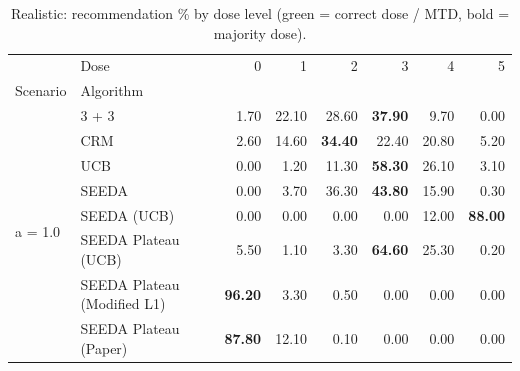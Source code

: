 \begin{table}[H]
\centering
\caption{Realistic: recommendation \% by dose level (green = correct dose / MTD, bold = majority dose).}
\label{tab:real_rec_by_dose}
\begin{tabular}{llrrrrrr}
\toprule
 & Dose & 0 & 1 & 2 & 3 & 4 & 5 \\
Scenario & Algorithm &  &  &  &  &  &  \\
\midrule
\multirow[c]{8}{*}{a = 1.0} & 3 + 3 & 1.70 & 22.10 & {\cellcolor[HTML]{C8E6C9}} 28.60 & \bfseries 37.90 & 9.70 & 0.00 \\
 & CRM & 2.60 & 14.60 & {\cellcolor[HTML]{C8E6C9}} \bfseries 34.40 & 22.40 & 20.80 & 5.20 \\
 & UCB & 0.00 & 1.20 & {\cellcolor[HTML]{C8E6C9}} 11.30 & \bfseries 58.30 & 26.10 & 3.10 \\
 & SEEDA & 0.00 & 3.70 & {\cellcolor[HTML]{C8E6C9}} 36.30 & \bfseries 43.80 & 15.90 & 0.30 \\
 & SEEDA (UCB) & 0.00 & 0.00 & {\cellcolor[HTML]{C8E6C9}} 0.00 & 0.00 & 12.00 & \bfseries 88.00 \\
 & SEEDA Plateau (UCB) & 5.50 & 1.10 & {\cellcolor[HTML]{C8E6C9}} 3.30 & \bfseries 64.60 & 25.30 & 0.20 \\
 & SEEDA Plateau (Modified L1) & \bfseries 96.20 & 3.30 & {\cellcolor[HTML]{C8E6C9}} 0.50 & 0.00 & 0.00 & 0.00 \\
 & SEEDA Plateau (Paper) & \bfseries 87.80 & 12.10 & {\cellcolor[HTML]{C8E6C9}} 0.10 & 0.00 & 0.00 & 0.00 \\
\bottomrule
\end{tabular}
\end{table}
